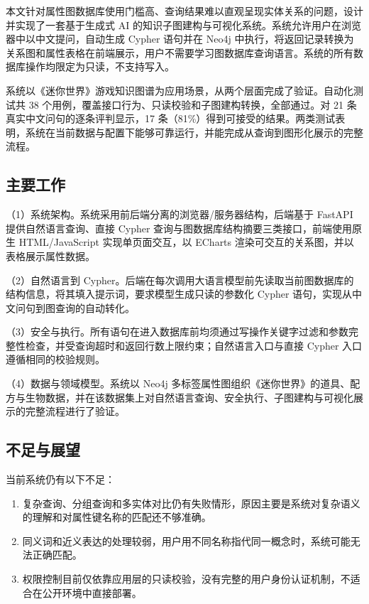 \documentclass[12pt,a4paper]{article}
\begin{document}
\begin{thesisconclusion}

本文针对属性图数据库使用门槛高、查询结果难以直观呈现实体关系的问题，设计并实现了一套基于生成式 AI 的知识子图建构与可视化系统。系统允许用户在浏览器中以中文提问，自动生成 Cypher 语句并在 Neo4j 中执行，将返回记录转换为关系图和属性表格在前端展示，用户不需要学习图数据库查询语言。系统的所有数据库操作均限定为只读，不支持写入。

系统以《迷你世界》游戏知识图谱为应用场景，从两个层面完成了验证。自动化测试共 38 个用例，覆盖接口行为、只读校验和子图建构转换，全部通过。对 21 条真实中文问句的逐条评判显示，17 条（81\%）得到可接受的结果。两类测试表明，系统在当前数据与配置下能够可靠运行，并能完成从查询到图形化展示的完整流程。

\subsection*{主要工作}

（1）系统架构。系统采用前后端分离的浏览器/服务器结构，后端基于 FastAPI 提供自然语言查询、直接 Cypher 查询与图数据库结构摘要三类接口，前端使用原生 HTML/JavaScript 实现单页面交互，以 ECharts 渲染可交互的关系图，并以表格展示属性数据。

（2）自然语言到 Cypher。后端在每次调用大语言模型前先读取当前图数据库的结构信息，将其填入提示词，要求模型生成只读的参数化 Cypher 语句，实现从中文问句到图查询的自动转化。

（3）安全与执行。所有语句在进入数据库前均须通过写操作关键字过滤和参数完整性检查，并受查询超时和返回行数上限约束；自然语言入口与直接 Cypher 入口遵循相同的校验规则。

（4）数据与领域模型。系统以 Neo4j 多标签属性图组织《迷你世界》的道具、配方与生物数据，并在该数据集上对自然语言查询、安全执行、子图建构与可视化展示的完整流程进行了验证。

\subsection*{不足与展望}

当前系统仍有以下不足：
\begin{enumerate}[(1)]
    \item 复杂查询、分组查询和多实体对比仍有失败情形，原因主要是系统对复杂语义的理解和对属性键名称的匹配还不够准确。
    \item 同义词和近义表达的处理较弱，用户用不同名称指代同一概念时，系统可能无法正确匹配。
    \item 权限控制目前仅依靠应用层的只读校验，没有完整的用户身份认证机制，不适合在公开环境中直接部署。
\end{enumerate}


\end{thesisconclusion}
\end{document}
